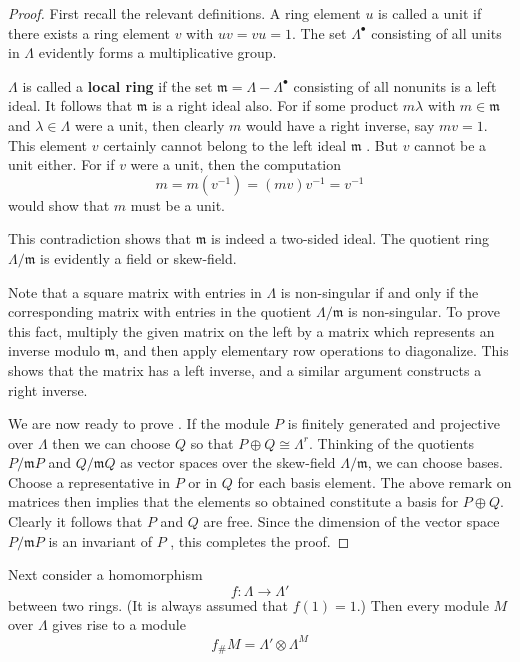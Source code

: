 \begin{proof}
	First recall the relevant definitions. A ring element $u$ is called a unit if there exists a ring element $v$ with $u v=v u=1$. The set $\Lambda^{\bullet}$ consisting of all units in $\Lambda$ evidently forms a multiplicative group.

	$\Lambda$ is called a \textbf{local ring} if the set $\mathfrak{m}=\Lambda-\Lambda^{\bullet}$ consisting of all nonunits is a left ideal. It follows that $\mathfrak{m}$ is a right ideal also. For if some product $m \lambda$ with $m \in \mathfrak{m}$ and $\lambda \in \Lambda$ were a unit, then clearly $m$ would have a right inverse, say $m v=1$. This element $v$ certainly cannot belong to the left ideal $\mathfrak{m}$ . But $v$ cannot be a unit either. For if $v$ were a unit, then the computation
	\[
	m=m\left(v^{-1}\right)=(mv) v^{-1}=v^{-1}
	\]
	would show that $m$ must be a unit.

	This contradiction shows that $\mathfrak{m}$ is indeed a two-sided ideal. The quotient ring $\Lambda / \mathfrak{m}$ is evidently a field or skew-field.

	Note that a square matrix with entries in $\Lambda$ is non-singular if and only if the corresponding matrix with entries in the quotient $\Lambda / \mathfrak{m}$ is non-singular. To prove this fact, multiply the given matrix on the left by a matrix which represents an inverse modulo $\mathfrak{m}$, and then apply elementary row operations to diagonalize. This shows that the matrix has a left inverse, and a similar argument constructs a right inverse.

	We are now ready to prove . If the module $P$ is finitely generated and projective over $\Lambda$ then we can choose $Q$ so that $P \oplus Q \cong \Lambda^{r}$. Thinking of the quotients $P / \mathfrak{m}P$ and $Q / \mathfrak{m}Q$ as vector spaces over the skew-field $\Lambda / \mathfrak{m}$, we can choose bases. Choose a representative in $P$ or in $Q$ for each basis element. The above remark on matrices then implies that the elements so obtained constitute a basis for $P \oplus Q$. Clearly it follows that $P$ and $Q$ are free. Since the dimension of the vector space $P / \mathfrak{m}P$ is an invariant of $P$ , this completes the proof.
\end{proof}

Next consider a homomorphism
\[
f: \Lambda \to \Lambda'
\]
between two rings. (It is always assumed that $f(1)=1$.) Then every module $M$ over $\Lambda$ gives rise to a module
\[
f_{\#} M=\Lambda' \otimes \Lambda^{M}
\]

